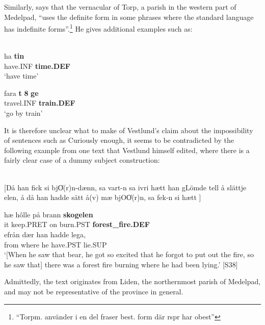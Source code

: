 \z

Similarly, \citet[140]{Bogren1921} says that the vernacular of Torp, a parish in the western part of Medelpad, “uses the definite form in some phrases where the standard language has indefinite forms”.\footnote{ “Torpm. använder i en del fraser best. form där rspr har obest”} He gives additional examples such as:

\ea\label{}
\\
\gll ha  \textbf{tin} \\
have.INF  \textbf{time.DEF} \\
\glt ‘have time’

\z

\ea
\gll fara  \textbf{t} \textbf{8} \textbf{ge}\\
travel.INF  \textbf{train.DEF}\\
\glt ‘go by train’

\z

It is therefore unclear what to make of Vestlund’s claim about the impossibility of sentences such as Curiously enough, it seems to be contradicted by the following example from one text that Vestlund himself edited, where there is a fairly clear case of a dummy subject construction:



\ea\label{}
\\
{}[Då han fick si bjO̍(r)n{}-dænn, sa vart-n sa ivri hætt han gLömde tell å slättje elen, å då han hadde sätt å(v) mæ bjOO̍(r)n, sa fek-n si hætt ]

\gll 	hæ  hôlle  på  brann  \textbf{skogelen}\\
		it  keep.PRET  on  burn.PST  \textbf{forest\_fire.DEF}\\
\gll 	efrån  dær  han  hadde  lega,\\
		from  where  he   have.PST  lie.SUP\\
\glt  	‘[When he saw that bear, he got so excited that he forgot to put out the fire, so he saw that] there was a forest fire burning where he had been lying.’ [S38]

\z

Admittedly, the text originates from Liden, the northernmost parish of Medelpad, and may not be representative of the province in general. 

